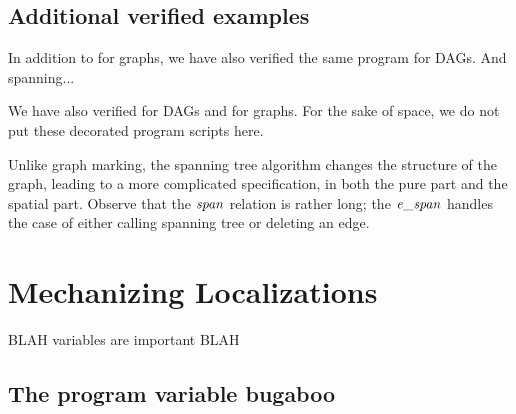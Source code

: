 \subsection{Additional verified examples}
\label{sec:application}

{\color{magenta}
In addition to  for graphs, we have also verified the same program for DAGs.  And spanning...


 We have also verified  for DAGs and  for
graphs.  For the sake of space, we do not put these decorated program scripts here.

Unlike graph marking, the spanning tree algorithm changes the
structure of the graph, leading to a more complicated specification,
in both the pure part and the spatial part. Observe that the $\mathit{span}$ relation is
rather long; the $\mathit{e\_span}$ handles the case of either calling spanning tree or deleting an edge.
}

\section{Mechanizing Localizations}

BLAH variables are important BLAH

\subsection{The program variable bugaboo}
\label{sec:freevars}

